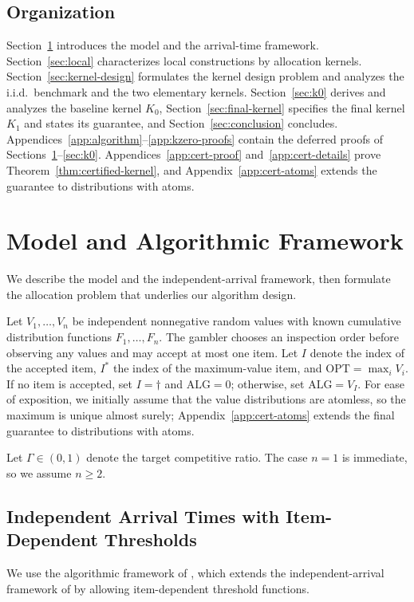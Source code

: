 \documentclass[11pt]{article}
\theoremstyle{definition}
\theoremstyle{remark}
\newcommand{\ALG}{\mathrm{ALG}}
\newcommand{\OPT}{\mathrm{OPT}}
\begin{document}
\subsection{Organization}\label{sec:organization}
Section~\ref{sec:model} introduces the model and the arrival-time framework.
Section~\ref{sec:local} characterizes local constructions by allocation kernels.
Section~\ref{sec:kernel-design} formulates the kernel design problem and analyzes the i.i.d.\
benchmark and the two elementary kernels. Section~\ref{sec:k0} derives and analyzes the
baseline kernel $K_0$, Section~\ref{sec:final-kernel} specifies the final kernel $K_1$
and states its guarantee, and Section~\ref{sec:conclusion} concludes.
Appendices~\ref{app:algorithm}--\ref{app:kzero-proofs} contain the
deferred proofs of Sections~\ref{sec:model}--\ref{sec:k0}.
Appendices~\ref{app:cert-proof} and~\ref{app:cert-details} prove
Theorem~\ref{thm:certified-kernel}, and Appendix~\ref{app:cert-atoms} extends the guarantee
to distributions with atoms.


\section{Model and Algorithmic Framework}\label{sec:model}
We describe the model and the independent-arrival framework, then formulate the allocation problem that underlies our algorithm design.

Let $V_1,\ldots,V_n$ be independent nonnegative random values with known cumulative distribution functions $F_1,\ldots,F_n$.
The gambler chooses an inspection order before observing any values and may accept at most one item.
Let $I$ denote the index of the accepted item, $I^*$ the index of the maximum-value item, and $\OPT=\max_i V_i$.
If no item is accepted, set $I=\dagger$ and $\ALG=0$; otherwise, set $\ALG=V_I$.
For ease of exposition, we initially assume that the value distributions are atomless, so the maximum is unique almost surely; Appendix~\ref{app:cert-atoms} extends the final guarantee to distributions with atoms.

Let $\Gamma\in(0,1)$ denote the target competitive ratio.
The case $n=1$ is immediate, so we assume $n\ge2$.

\subsection{Independent Arrival Times with Item-Dependent Thresholds}

We use the algorithmic framework of \citet{BC}, which extends the independent-arrival framework of \citet{PT} by allowing item-dependent threshold functions.
\end{document}
